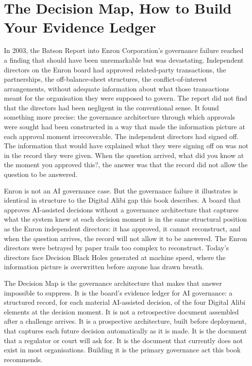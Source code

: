 
\chapter{The Decision Map, How to Build Your Evidence Ledger}

In 2003, the Batson Report into Enron Corporation's governance failure reached a finding that should have been unremarkable but was devastating. Independent directors on the Enron board had approved related-party transactions, the partnerships, the off-balance-sheet structures, the conflict-of-interest arrangements, without adequate information about what those transactions meant for the organisation they were supposed to govern. The report did not find that the directors had been negligent in the conventional sense. It found something more precise: the governance architecture through which approvals were sought had been constructed in a way that made the information picture at each approval moment irrecoverable. The independent directors had signed off. The information that would have explained what they were signing off on was not in the record they were given. When the question arrived, what did you know at the moment you approved this?, the answer was that the record did not allow the question to be answered.

Enron is not an AI governance case. But the governance failure it illustrates is identical in structure to the Digital Alibi gap this book describes. A board that approves AI-assisted decisions without a governance architecture that captures what the system knew at each decision moment is in the same structural position as the Enron independent directors: it has approved, it cannot reconstruct, and when the question arrives, the record will not allow it to be answered. The Enron directors were betrayed by paper trails too complex to reconstruct. Today's directors face Decision Black Holes generated at machine speed, where the information picture is overwritten before anyone has drawn breath.

The Decision Map is the governance architecture that makes that answer impossible to suppress. It is the board's evidence ledger for AI governance: a structured record, for each material AI-assisted decision, of the four Digital Alibi elements at the decision moment. It is not a retrospective document assembled after a challenge arrives. It is a prospective architecture, built before deployment, that captures each future decision automatically as it is made. It is the document that a regulator or court will ask for. It is the document that currently does not exist in most organisations. Building it is the primary governance act this book recommends.

